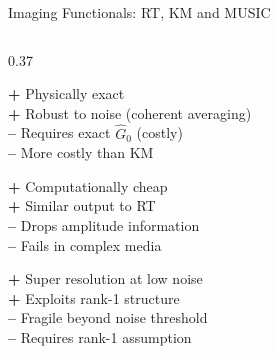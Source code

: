 \documentclass{beamer}
\begin{document}
\begin{frame}{Imaging Functionals: RT, KM and MUSIC}
\begin{minipage}{\dimexpr\textwidth+0.7cm\relax}
\begin{columns}[T]
  \begin{column}{0.37\textwidth}
    \begin{tcolorbox}[keybox, title=, top=2pt, bottom=2pt]
      \scriptsize
      \textcolor{greenok}{\textbf{+}} Physically exact\\
      \textcolor{greenok}{\textbf{+}} Robust to noise (coherent averaging)\\
      \textcolor{CSred}{\textbf{--}} Requires exact $\hat{G}_0$ (costly)\\
      \textcolor{CSred}{\textbf{--}} More costly than KM
    \end{tcolorbox}


    \begin{tcolorbox}[warnbox, title=, top=2pt, bottom=2pt] 
      \scriptsize
      \textcolor{greenok}{\textbf{+}} Computationally cheap\\
      \textcolor{greenok}{\textbf{+}} Similar output to RT\\
      \textcolor{CSred}{\textbf{--}} Drops amplitude information\\
      \textcolor{CSred}{\textbf{--}} Fails in complex media
    \end{tcolorbox}

    \begin{tcolorbox}[resultbox, title=, top=2pt, bottom=2pt]
      \scriptsize
      \textcolor{greenok}{\textbf{+}} Super resolution at low noise\\
      \textcolor{greenok}{\textbf{+}} Exploits rank-1 structure\\
      \textcolor{CSred}{\textbf{--}} Fragile beyond noise threshold\\
      \textcolor{CSred}{\textbf{--}} Requires rank-1 assumption
    \end{tcolorbox}
  \end{column}
  \end{columns} 
  \end{minipage} 
\end{frame}
\end{document}
